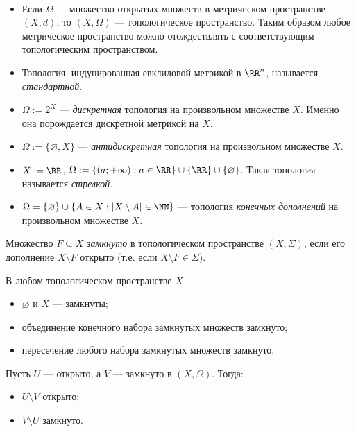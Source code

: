 \documentclass[12pt,a4paper]{article}
\begin{document}
    \begin{example}\ 
        \begin{itemize}
            \item Если $\Omega$ --- множество открытых множеств в метрическом пространстве $(X, d)$, то $(X, \Omega)$ --- топологическое пространство. Таким образом любое метрическое пространство можно отождествлять с соответствующим топологическим пространством.
            \item Топология, индуцированная евклидовой метрикой в $\RR^n$, называется \emph{стандартной}.
            \item $\Omega := 2^X$ --- \emph{дискретная} топология на произвольном множестве $X$. Именно она порождается дискретной метрикой на $X$.
            \item $\Omega := \{\varnothing, X\}$ --- \emph{антидискретная} топология на произвольном множестве $X$.
            \item $X := \RR$, $\Omega := \{(a; +\infty) : a \in \RR\} \cup \{\RR\} \cup \{\varnothing\}$. Такая топология называется \emph{стрелкой}.
            \item $\Omega = \{\varnothing\} \cup \{A \in X: |X\setminus A| \in \NN\}$ --- топология \emph{конечных дополнений} на произвольном множестве $X$.
        \end{itemize}
    \end{example}

    \begin{definition}
        Множество $F \subseteq X$ \emph{замкнуто} в топологическом пространстве $(X, \Sigma)$, если его дополнение $X \setminus F$ открыто (т.е. если $X \setminus F \in \Sigma$).
    \end{definition}

    \begin{theorem}
        В любом топологическом пространстве $X$
        \begin{itemize}
            \item $\varnothing$ и $X$ --- замкнуты;
            \item объединение конечного набора замкнутых множеств замкнуто;
            \item пересечение любого набора замкнутых множеств замкнуто.
        \end{itemize}
    \end{theorem}

    \begin{theorem}
        Пусть $U$ --- открыто, а $V$ --- замкнуто в $(X, \Omega)$. Тогда:
        \begin{itemize}
            \item $U \setminus V$ открыто;
            \item $V \setminus U$ замкнуто.
        \end{itemize}
    \end{theorem}
\end{document}
